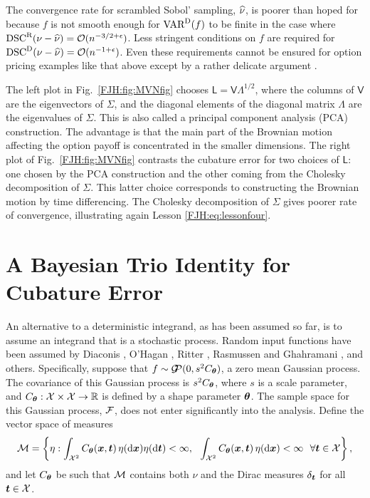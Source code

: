 \documentclass[graybox,footinfo]{svmult}
\begin{document}
The convergence rate for scrambled Sobol' sampling, $\widehat{\nu}$,  is poorer than hoped for 
because 
$f$ is not smooth enough for $\textup{VAR}^{\textup{D}}(f)$ to be finite in the case 
where $\textup{DSC}^{\textup{R}}(\nu - \widehat{\nu}) = {\mathcal{O}}(n^{-3/2 +\epsilon})$.  Less 
stringent conditions on $f$ are required for $\textup{DSC}^{\textup{D}}(\nu - \widehat{\nu}) = 
{\mathcal{O}}(n^{-1 +\epsilon})$.  Even these requirements cannot 
be ensured for option pricing examples like that above except by a rather delicate 
argument \cite{GriKuoSlo10, GriKuoSlo16}.

\begin{FJHLesson}
	\FJHLessonFive
\end{FJHLesson}

The left plot in Fig.\ \ref{FJH:fig:MVNfig} chooses $\mathsf{L} = 
\mathsf{V}\mathsf{\Lambda}^{1/2}$, where the columns of $\mathsf{V}$ are the 
eigenvectors of $\mathsf{\Sigma}$, and the diagonal elements of the diagonal matrix  
$\mathsf{\Lambda}$ are the eigenvalues of $\mathsf{\Sigma}$.  This is also called a 
principal component analysis (PCA) construction.  The advantage is that the main part of 
the 
Brownian motion affecting the option payoff is concentrated in the smaller dimensions.  
The right plot of Fig.\ 
\ref{FJH:fig:MVNfig} contrasts the cubature error for two choices of  $\mathsf{L}$:  one 
chosen by the PCA construction and the other coming from the Cholesky decomposition 
of $\mathsf{\Sigma}$.  This latter choice corresponds to constructing the Brownian 
motion by time 
differencing.  The Cholesky decomposition of $\mathsf{\Sigma}$ gives poorer rate of 
convergence, illustrating again Lesson \ref{FJH:eq:lessonfour}.


\section{A Bayesian Trio  Identity for Cubature Error} \label{FJH:sec:BayesTrio}
An alternative to a deterministic integrand, as has been assumed so far, is to assume an 
integrand that is a stochastic process.  Random input functions have been assumed by 
Diaconis \cite{Dia88a}, O'Hagan \cite{OHa91a}, Ritter \cite{Rit00a}, Rasmussen and 
Ghahramani \cite{RasGha03a}, and others. Specifically, suppose that $f \sim {\mathcal{G}}\!\!{\mathcal{P}} (0, 
s^2C_{{\boldsymbol{\theta}}})$, a zero mean Gaussian process.  The covariance of 
this  Gaussian process is $s^2C_{{\boldsymbol{\theta}}}$, where $s$ is a scale parameter, and 
$C_{{\boldsymbol{\theta}}}:{\mathcal{X}} \times {\mathcal{X}} \to {\mathbb{R}}$ is defined by a shape parameter ${\boldsymbol{\theta}}$.  
The 
sample space for this Gaussian process, ${\mathcal{F}}$, does not enter significantly into the 
analysis.  Define the vector space of measures 
\begin{equation*}
{\mathcal{M}} = \left\{\eta :  \int_{{\mathcal{X}}^2} C_{\boldsymbol{\theta}}({\boldsymbol{x}},{\boldsymbol{t}}) 
\, \eta(\mathrm{d} {\boldsymbol{x}}) \eta(\mathrm{d} {\boldsymbol{t}}) < \infty, \ \ \int_{{\mathcal{X}}^2} C_{\boldsymbol{\theta}}({\boldsymbol{x}},{\boldsymbol{t}}) 
\, \eta(\mathrm{d} {\boldsymbol{x}}) < \infty \ \ \forall {\boldsymbol{t}} \in {\mathcal{X}} \right \},
\end{equation*}
and let $C_{{\boldsymbol{\theta}}}$ be such that ${\mathcal{M}}$ contains both $\nu$ and the Dirac 
measures 
$\delta_{{\boldsymbol{t}}}$ for all ${\boldsymbol{t}} \in {\mathcal{X}}$. 
\end{document}
